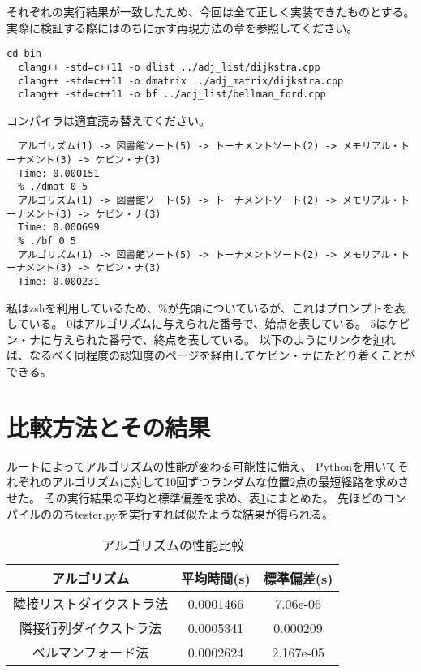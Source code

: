 \documentclass[12pt, a4paper, dvipdfmx]{jarticle}
\begin{document}
それぞれの実行結果が一致したため、今回は全て正しく実装できたものとする。
実際に検証する際にはのちに示す再現方法の章を参照してください。
\begin{lstlisting}[caption=コンパイル方法,label=sample]
  cd bin
  clang++ -std=c++11 -o dlist ../adj_list/dijkstra.cpp
  clang++ -std=c++11 -o dmatrix ../adj_matrix/dijkstra.cpp
  clang++ -std=c++11 -o bf ../adj_list/bellman_ford.cpp
\end{lstlisting}
コンパイラは適宜読み替えてください。
\begin{lstlisting}[caption=それぞれの実行結果,label=sample]
  % ./dlist 0 5
  アルゴリズム(1) -> 図書館ソート(5) -> トーナメントソート(2) -> メモリアル・トーナメント(3) -> ケビン・ナ(3)
  Time: 0.000151
  % ./dmat 0 5
  アルゴリズム(1) -> 図書館ソート(5) -> トーナメントソート(2) -> メモリアル・トーナメント(3) -> ケビン・ナ(3)
  Time: 0.000699
  % ./bf 0 5
  アルゴリズム(1) -> 図書館ソート(5) -> トーナメントソート(2) -> メモリアル・トーナメント(3) -> ケビン・ナ(3)
  Time: 0.000231
\end{lstlisting}
私はzshを利用しているため、\%が先頭についているが、これはプロンプトを表している。
0はアルゴリズムに与えられた番号で、始点を表している。
5はケビン・ナに与えられた番号で、終点を表している。
以下のようにリンクを辿れば、なるべく同程度の認知度のページを経由してケビン・ナにたどり着くことができる。

\section{比較方法とその結果}\label{section:compare}
ルートによってアルゴリズムの性能が変わる可能性に備え、
Pythonを用いてそれぞれのアルゴリズムに対して10回ずつランダムな位置2点の最短経路を求めさせた。
その実行結果の平均と標準偏差を求め、表\ref{tab:table1}にまとめた。
先ほどのコンパイルののちtester.pyを実行すれば似たような結果が得られる。

\begin{table}[h]
  \centering
  \caption{アルゴリズムの性能比較} \label{tab:table1}
  \begin{tabular}{|c||c|c|}
    \hline
    アルゴリズム       & 平均時間(s)   & 標準偏差(s)   \\
    \hline
    \hline
    隣接リストダイクストラ法 & 0.0001466 & 7.06e-06  \\
    \hline
    隣接行列ダイクストラ法  & 0.0005341 & 0.000209  \\
    \hline
    ベルマンフォード法    & 0.0002624 & 2.167e-05 \\
    \hline
  \end{tabular}
\end{table}
\end{document}
